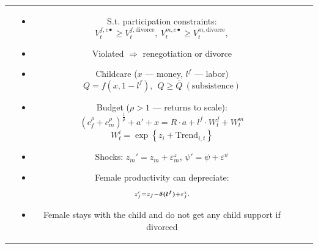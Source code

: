 \documentclass[landscape,a0paper,fontscale=0.285]{baposter} %
\begin{document}
\begin{poster}
{\begin{tabular}{c c c c}
\begin{minipage}{0.225\linewidth}
{%
}
\end{minipage}
&
\hspace{-2em}
\begin{minipage}{0.225\linewidth}
\vspace{-0.5cm}
{\footnotesize
\begin{itemize}
\item S.t. participation constraints:
\vspace{-0.5em}
\[\scriptstyle V^{f,c\bullet}_t \geq V^{f,\text{divorce}}_t, \ V^{m,c\bullet}_t \geq V^{m,\text{divorce}}_t,\]
\vspace{-2em}
\item Violated $\Rightarrow$ renegotiation or divorce
\item Childcare ($x$ --- money, $l^f$ --- labor)
\vspace{-1.0em}
\[\scriptstyle Q = f(x,1-l^f), \ \ Q \geq \bar{Q} \ (\text{subsistence})\]
\vspace{-1.5em}
\item Budget ($\rho>1$ --- returns to scale): 
\vspace{-0.75em}
\[\scriptstyle (c_f^{\rho} + c_m^{\rho})^{\frac1{\rho}} + a' + x = R\cdot a + l^f \cdot W^f_t + W^m_t\]
\[\scriptstyle W^i_t= \exp\left\{z_i + \text{Trend}_{i,t}\right\}\]
\vspace{-1.75em}
\item Shocks: $\scriptstyle z_m' = z_m + \varepsilon^{z}_m$, $\scriptstyle \psi' = \psi + \varepsilon^{\psi}$ 
\item Female productivity can depreciate:
\vspace{-0.75em}
\[\scriptstyle z_f' = z_f -  \text{{\boldmath $\delta (l^f)$}} + \varepsilon^{z}_f.\]
\item Female stays with the child and do not get any child support if divorced
\end{itemize}
}
\end{minipage}
\end{tabular}
}




\end{poster}
\end{document}
